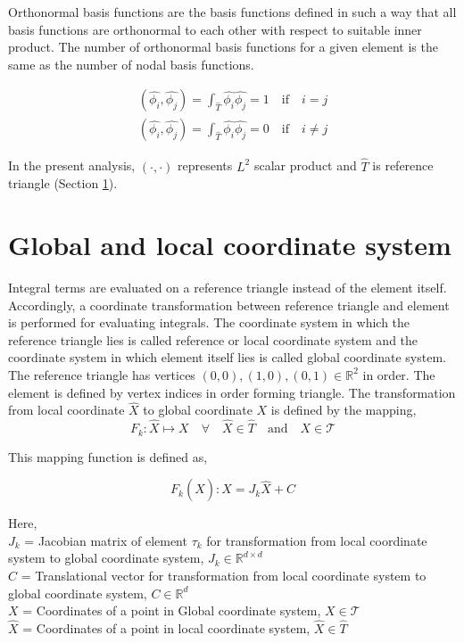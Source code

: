 \documentclass[a4paper]{book}
\begin{document}
Orthonormal basis functions are the basis functions defined in such a way that all basis functions are orthonormal to each other with respect to suitable inner product. The number of orthonormal basis functions for a given element is the same as the number of nodal basis functions. 

\begin{equation}
\begin{split}
(\hat{\phi_i } , \hat{\phi_j}) = \int_{\hat{T}} \hat{\phi_i} \hat{\phi_j} = 1 \quad \textrm{if} \quad i = j \\
(\hat{\phi_i } , \hat{\phi_j}) = \int_{\hat{T}} \hat{\phi_i} \hat{\phi_j} = 0 \quad \textrm{if} \quad i \neq j 
\end{split}
\end{equation}

In the present analysis, $(\cdot,\cdot)$ represents $L^2$ scalar product and $\hat{T}$ is reference triangle (Section \ref{section_glob_loc}). 

\section{Global and local coordinate system} \label{section_glob_loc}

Integral terms are evaluated on a reference triangle instead of the element itself. Accordingly, a coordinate transformation between reference triangle and element is performed for evaluating integrals. The coordinate system in which the reference triangle lies is called reference or local coordinate system and the coordinate system in which element itself lies is called global coordinate system. The reference triangle has vertices $(0,0),(1,0),(0,1) \in \mathbb{R}^2$ in order. The element is defined by vertex indices in order forming triangle. The transformation from local coordinate $\hat{X}$ to global coordinate $X$ is defined by the mapping,
\begin{equation}\label{local global mapping}
F_k:\hat{X} \mapsto X \quad \forall \quad \hat{X} \in \hat{T} \quad \textrm{and} \quad X \in \mathcal{T}
\end{equation}

This mapping function is defined as,

\begin{equation}\label{local global mapping equation}
F_k(\hat{X}): X = J_k \hat{X} + C
\end{equation}

Here,
\\
$J_k$ = Jacobian matrix of element $\tau_k$ for transformation from local coordinate system to global coordinate system, $J_k \in \mathbb{R}^{d \times d}$\\
$C$ = Translational vector for transformation from local coordinate system to global coordinate system, $C \in \mathbb{R}^d$\\
$X$ = Coordinates of a point in Global coordinate system, $X \in \mathcal{T}$ \\
$\hat{X}$ = Coordinates of a point in local coordinate system, $\hat{X} \in \hat{T}$\\
\end{document}
